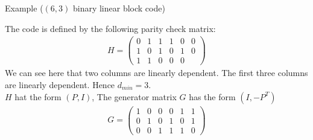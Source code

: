 \begin{parag}{Example ($\left(6, 3\right)$ binary linear block code) }

    The code is defined by the following parity check matrix:
    \begin{align*} 
        H =  \begin{pmatrix} 0&1  & 1 & 1 & 0 & 0 \\ 1 & 0 & 1 & 0 & 1 & 0 \\ 1 & 1 & 0 & 0 & 0 &  \end{pmatrix} 
    \end{align*}
    We can see here that    two columns are linearly dependent. The first three columns are linearly dependent. Hence $d_{min} =  3$.\\
    $H$ hat the form $\left(P, I\right)$, The generator matrix $G$ has the form $\left(I,-P^T\right)$
    \begin{align*} 
        G = \begin{pmatrix} 1 & 0 & 0 & 0 & 1 & 1 \\ 0 & 1 & 0 & 1 & 0 & 1 \\ 0 & 0 & 1 & 1 & 1 & 0  \end{pmatrix} 
    \end{align*}

\end{parag}



